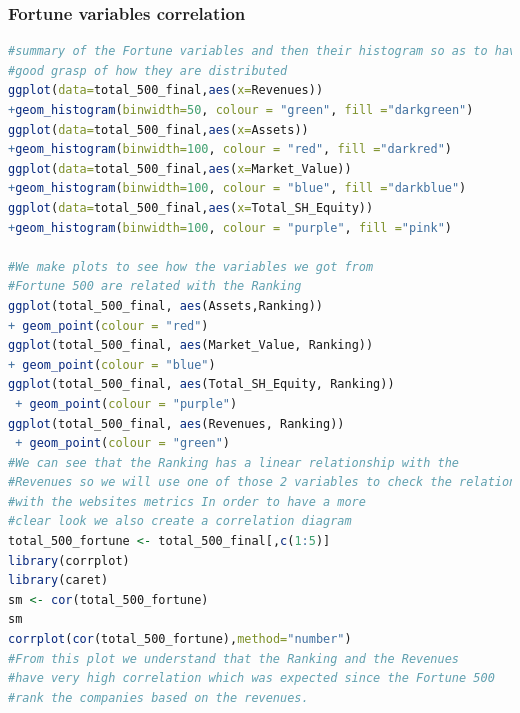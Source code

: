 \documentclass{book}
\begin{document}
\subsubsection{Fortune variables correlation}\label{r: van: fortune}
\begin{lstlisting}[language=R] 
#summary of the Fortune variables and then their histogram so as to have a 
#good grasp of how they are distributed
ggplot(data=total_500_final,aes(x=Revenues))
+geom_histogram(binwidth=50, colour = "green", fill ="darkgreen")
ggplot(data=total_500_final,aes(x=Assets))
+geom_histogram(binwidth=100, colour = "red", fill ="darkred")
ggplot(data=total_500_final,aes(x=Market_Value))
+geom_histogram(binwidth=100, colour = "blue", fill ="darkblue")
ggplot(data=total_500_final,aes(x=Total_SH_Equity))
+geom_histogram(binwidth=100, colour = "purple", fill ="pink")

#We make plots to see how the variables we got from
#Fortune 500 are related with the Ranking
ggplot(total_500_final, aes(Assets,Ranking)) 
+ geom_point(colour = "red")
ggplot(total_500_final, aes(Market_Value, Ranking)) 
+ geom_point(colour = "blue")
ggplot(total_500_final, aes(Total_SH_Equity, Ranking))
 + geom_point(colour = "purple")
ggplot(total_500_final, aes(Revenues, Ranking))
 + geom_point(colour = "green")
#We can see that the Ranking has a linear relationship with the 
#Revenues so we will use one of those 2 variables to check the relationships 
#with the websites metrics In order to have a more 
#clear look we also create a correlation diagram
total_500_fortune <- total_500_final[,c(1:5)]
library(corrplot)
library(caret)
sm <- cor(total_500_fortune)
sm
corrplot(cor(total_500_fortune),method="number")
#From this plot we understand that the Ranking and the Revenues 
#have very high correlation which was expected since the Fortune 500
#rank the companies based on the revenues. 
\end{lstlisting}
\end{document}
